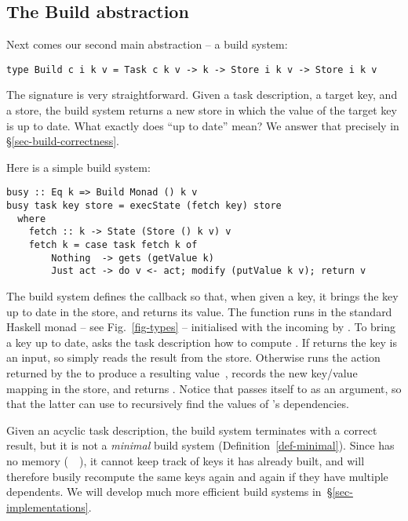 \subsection{The Build abstraction}\label{sec-general-build}

Next comes our second main abstraction -- a build system:
\vspace{1mm}
\begin{verbatim}
type Build c i k v = Task c k v -> k -> Store i k v -> Store i k v
\end{verbatim}
\vspace{1mm}
The signature is very straightforward.  Given a task description, a target key,
and a store, the build system returns a new store in which the value of the
target key is up to date. What exactly does ``up to date'' mean?  We answer
that precisely in \S\ref{sec-build-correctness}.

\noindent
Here is a simple build system:
\vspace{1mm}
\begin{verbatim}
busy :: Eq k => Build Monad () k v
busy task key store = execState (fetch key) store
  where
    fetch :: k -> State (Store () k v) v
    fetch k = case task fetch k of
        Nothing  -> gets (getValue k)
        Just act -> do v <- act; modify (putValue k v); return v
\end{verbatim}
\vspace{1mm}

\noindent
The  build system defines the callback  so that, when given a
key, it brings the key up to date in the store, and returns its value.
The function  runs in the standard Haskell  monad -- see
Fig.~\ref{fig-types} -- initialised with the incoming  by .
To bring a key up to date,  asks the task description  how
to compute . If  returns  the key is an input, so
 simply reads the result from the store. Otherwise  runs
the action  returned by the  to produce a resulting
value~, records the new key/value mapping in the store, and returns .
Notice that  passes itself to  as an argument, so that the
latter can use  to recursively find the values of 's dependencies.

Given an acyclic task description, the  build system terminates with a
correct result, but it is not a \emph{minimal} build system
(Definition~\ref{def-minimal}). Since  has no memory
(~\hs{=}~\hs{()}), it cannot keep track of keys it has already built, and
will therefore busily recompute the same keys again and again if they have
multiple dependents. We will develop much more efficient build systems
in~\S\ref{sec-implementations}.

